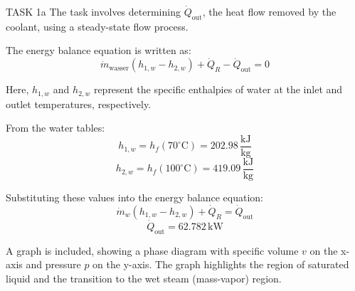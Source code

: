 TASK 1a  
The task involves determining \( \dot{Q}_{\text{out}} \), the heat flow removed by the coolant, using a steady-state flow process.  

The energy balance equation is written as:  
\[
\dot{m}_{\text{wasser}} (h_{1,w} - h_{2,w}) + \dot{Q}_R - \dot{Q}_{\text{out}} = 0
\]  

Here, \( h_{1,w} \) and \( h_{2,w} \) represent the specific enthalpies of water at the inlet and outlet temperatures, respectively.  

From the water tables:  
\[
h_{1,w} = h_f(70^\circ\text{C}) = 202.98 \, \frac{\text{kJ}}{\text{kg}}
\]  
\[
h_{2,w} = h_f(100^\circ\text{C}) = 419.09 \, \frac{\text{kJ}}{\text{kg}}
\]  

Substituting these values into the energy balance equation:  
\[
\dot{m}_w (h_{1,w} - h_{2,w}) + \dot{Q}_R = \dot{Q}_{\text{out}}
\]  
\[
\dot{Q}_{\text{out}} = 62.782 \, \text{kW}
\]  

A graph is included, showing a phase diagram with specific volume \( v \) on the x-axis and pressure \( p \) on the y-axis. The graph highlights the region of saturated liquid and the transition to the wet steam (mass-vapor) region.  

